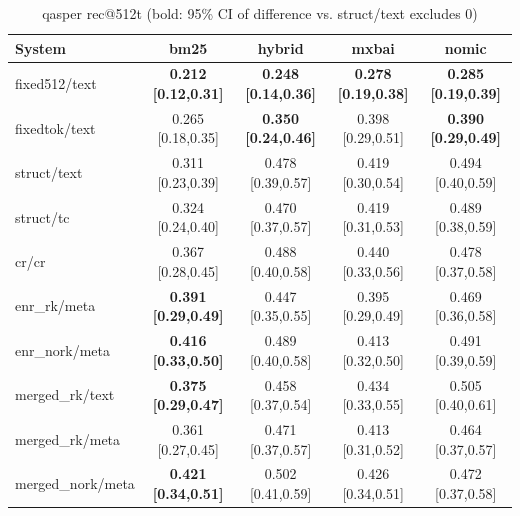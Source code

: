 \begin{table}[t]
\centering\small
\caption{qasper rec@512t (bold: 95\% CI of difference vs. struct/text excludes 0)}
\label{tab:qasper}
\begin{tabular}{lcccc}
\toprule
System & bm25 & hybrid & mxbai & nomic \\
\midrule
fixed512/text & \textbf{0.212 {\scriptsize[0.12,0.31]}} & \textbf{0.248 {\scriptsize[0.14,0.36]}} & \textbf{0.278 {\scriptsize[0.19,0.38]}} & \textbf{0.285 {\scriptsize[0.19,0.39]}} \\
fixedtok/text & 0.265 {\scriptsize[0.18,0.35]} & \textbf{0.350 {\scriptsize[0.24,0.46]}} & 0.398 {\scriptsize[0.29,0.51]} & \textbf{0.390 {\scriptsize[0.29,0.49]}} \\
struct/text & 0.311 {\scriptsize[0.23,0.39]} & 0.478 {\scriptsize[0.39,0.57]} & 0.419 {\scriptsize[0.30,0.54]} & 0.494 {\scriptsize[0.40,0.59]} \\
struct/tc & 0.324 {\scriptsize[0.24,0.40]} & 0.470 {\scriptsize[0.37,0.57]} & 0.419 {\scriptsize[0.31,0.53]} & 0.489 {\scriptsize[0.38,0.59]} \\
cr/cr & 0.367 {\scriptsize[0.28,0.45]} & 0.488 {\scriptsize[0.40,0.58]} & 0.440 {\scriptsize[0.33,0.56]} & 0.478 {\scriptsize[0.37,0.58]} \\
enr\_rk/meta & \textbf{0.391 {\scriptsize[0.29,0.49]}} & 0.447 {\scriptsize[0.35,0.55]} & 0.395 {\scriptsize[0.29,0.49]} & 0.469 {\scriptsize[0.36,0.58]} \\
enr\_nork/meta & \textbf{0.416 {\scriptsize[0.33,0.50]}} & 0.489 {\scriptsize[0.40,0.58]} & 0.413 {\scriptsize[0.32,0.50]} & 0.491 {\scriptsize[0.39,0.59]} \\
merged\_rk/text & \textbf{0.375 {\scriptsize[0.29,0.47]}} & 0.458 {\scriptsize[0.37,0.54]} & 0.434 {\scriptsize[0.33,0.55]} & 0.505 {\scriptsize[0.40,0.61]} \\
merged\_rk/meta & 0.361 {\scriptsize[0.27,0.45]} & 0.471 {\scriptsize[0.37,0.57]} & 0.413 {\scriptsize[0.31,0.52]} & 0.464 {\scriptsize[0.37,0.57]} \\
merged\_nork/meta & \textbf{0.421 {\scriptsize[0.34,0.51]}} & 0.502 {\scriptsize[0.41,0.59]} & 0.426 {\scriptsize[0.34,0.51]} & 0.472 {\scriptsize[0.37,0.58]} \\
\bottomrule
\end{tabular}
\end{table}